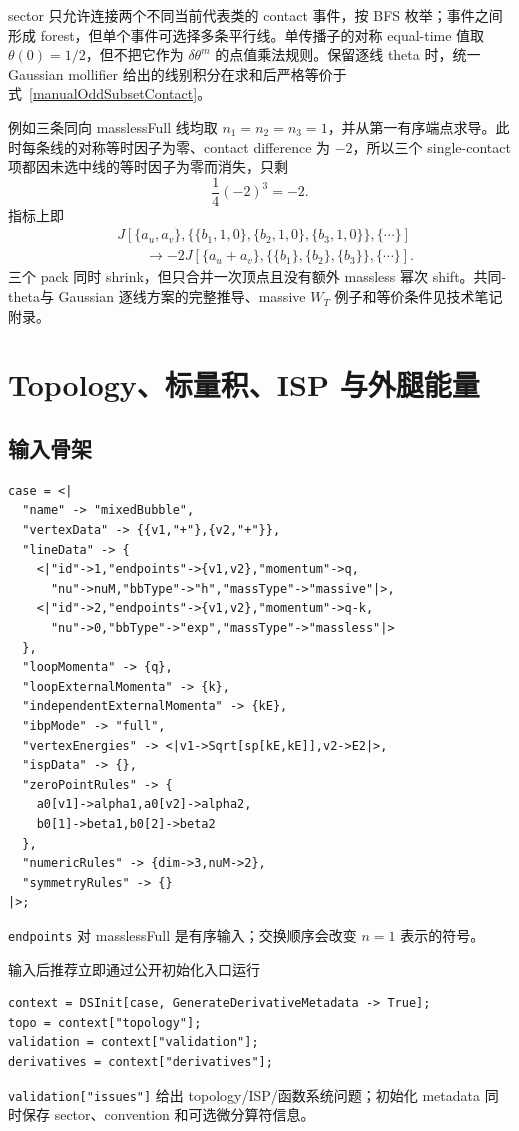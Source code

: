 ﻿\documentclass[a4paper,11pt]{article}
\begin{document}
sector 只允许连接两个不同当前代表类的 contact 事件，按 BFS 枚举；事件之间形成 forest，但单个事件可选择多条平行线。单传播子的对称 equal-time 值取 $\theta(0)=1/2$，但不把它作为 $\delta\theta^m$ 的点值乘法规则。保留逐线 theta 时，统一 Gaussian mollifier 给出的线别积分在求和后严格等价于式~\eqref{manualOddSubsetContact}。

例如三条同向 masslessFull 线均取 $n_1=n_2=n_3=1$，并从第一有序端点求导。此时每条线的对称等时因子为零、contact difference 为 $-2$，所以三个 single-contact 项都因未选中线的等时因子为零而消失，只剩
\begin{equation}
 \frac14(-2)^3=-2.
\end{equation}
指标上即
\begin{align}
 &J[\{a_u,a_v\},
   \{\{b_1,1,0\},\{b_2,1,0\},\{b_3,1,0\}\},\{\cdots\}]
 \nonumber\\
 &\qquad\longrightarrow
 -2J[\{a_u+a_v\},\{\{b_1\},\{b_2\},\{b_3\}\},\{\cdots\}].
\end{align}
三个 pack 同时 shrink，但只合并一次顶点且没有额外 massless 幂次 shift。共同-theta与 Gaussian 逐线方案的完整推导、massive $W_T$ 例子和等价条件见技术笔记附录。

\section{Topology、标量积、ISP 与外腿能量}

\subsection{输入骨架}

\begin{verbatim}
case = <|
  "name" -> "mixedBubble",
  "vertexData" -> {{v1,"+"},{v2,"+"}},
  "lineData" -> {
    <|"id"->1,"endpoints"->{v1,v2},"momentum"->q,
      "nu"->nuM,"bbType"->"h","massType"->"massive"|>,
    <|"id"->2,"endpoints"->{v1,v2},"momentum"->q-k,
      "nu"->0,"bbType"->"exp","massType"->"massless"|>
  },
  "loopMomenta" -> {q},
  "loopExternalMomenta" -> {k},
  "independentExternalMomenta" -> {kE},
  "ibpMode" -> "full",
  "vertexEnergies" -> <|v1->Sqrt[sp[kE,kE]],v2->E2|>,
  "ispData" -> {},
  "zeroPointRules" -> {
    a0[v1]->alpha1,a0[v2]->alpha2,
    b0[1]->beta1,b0[2]->beta2
  },
  "numericRules" -> {dim->3,nuM->2},
  "symmetryRules" -> {}
|>;
\end{verbatim}
\texttt{endpoints} 对 masslessFull 是有序输入；交换顺序会改变 $n=1$ 表示的符号。

输入后推荐立即通过公开初始化入口运行
\begin{verbatim}
context = DSInit[case, GenerateDerivativeMetadata -> True];
topo = context["topology"];
validation = context["validation"];
derivatives = context["derivatives"];
\end{verbatim}
\texttt{validation["issues"]} 给出 topology/ISP/函数系统问题；初始化 metadata 同时保存 sector、convention 和可选微分算符信息。
\end{document}
